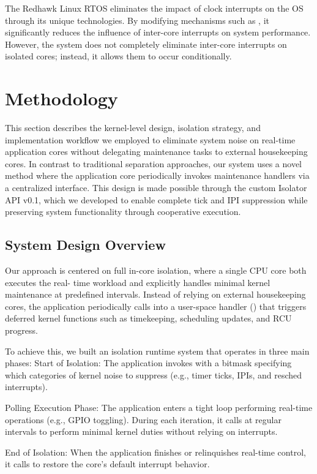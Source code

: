\documentclass[letterpaper]{article}
\begin{document}
The Redhawk Linux RTOS\cite{redhawk} eliminates the impact of clock interrupts on the OS through its unique
technologies. By modifying mechanisms such as , it significantly reduces the influence of inter-core
interrupts on system performance. However, the system does not completely eliminate inter-core
interrupts on isolated cores; instead, it allows them to occur conditionally.

\section{Methodology}\label{BE}

This section describes the kernel-level design, isolation strategy, and implementation workflow we
employed to eliminate system noise on real-time application cores without delegating
maintenance tasks to external housekeeping cores. In contrast to traditional separation
approaches, our system uses a novel method where the application core periodically invokes
maintenance handlers via a centralized interface. This design is made possible through the custom
Isolator API v0.1, which we developed to enable complete tick and IPI suppression while
preserving system functionality through cooperative execution.


\subsection{System Design Overview}

Our approach is centered on full in-core isolation, where a single CPU core both executes the real-
time workload and explicitly handles minimal kernel maintenance at predefined intervals. Instead
of relying on external housekeeping cores, the application periodically calls into a user-space
handler () that triggers deferred kernel functions such as timekeeping, scheduling updates, and
RCU progress.


To achieve this, we built an isolation runtime system that operates in three main phases:
Start of Isolation: The application invokes with a bitmask specifying which categories of kernel
noise to suppress (e.g., timer ticks, IPIs, and resched interrupts).


Polling Execution Phase: The application enters a tight loop performing real-time operations (e.g.,
GPIO toggling). During each iteration, it calls at regular intervals to perform minimal
kernel duties without relying on interrupts.


End of Isolation: When the application finishes or relinquishes real-time control, it calls to restore
the core’s default interrupt behavior.
\end{document}
